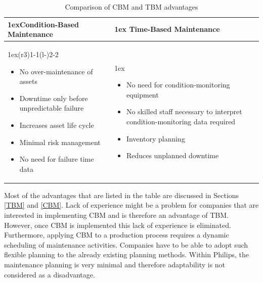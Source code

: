 \begin{table}[ht]
\caption{Comparison of CBM and TBM advantages}
\label{tab:Comparison CBM and TBM}
\begin{tabularx}{\linewidth}{>{\parskip1ex}X@{\kern4\tabcolsep}>{\parskip1ex}X}
\hfil\bfseries Condition-Based Maintenance
&
\hfil\bfseries Time-Based Maintenance\\
\cmidrule(r{3\tabcolsep}){1-1}\cmidrule(l{-\tabcolsep}){2-2}
\begin{itemize}
\item No over-maintenance of assets
\item Downtime only before unpredictable failure
\item Increases asset life cycle
\item Minimal risk management
\item No need for failure time data
\end{itemize}
&
\begin{itemize}
\item No need for condition-monitoring equipment
\item No skilled staff necessary to interpret condition-monitoring data required
\item Inventory planning
\item Reduces unplanned downtime
\end{itemize}\\
\end{tabularx}
\end{table}
Most of the advantages that are listed in the table are discussed in Sections \ref{TBM} and \ref{CBM}. Lack of experience might be a problem for companies that are interested in implementing CBM \parencite{ZIO2013} and is therefore an advantage of TBM. However, once CBM is implemented this lack of experience is eliminated. Furthermore, applying CBM to a production process requires a dynamic scheduling of maintenance activities. Companies have to be able to adopt such flexible planning to the already existing planning methods. Within Philips, the maintenance planning is very minimal and therefore adaptability is not considered as a disadvantage.

